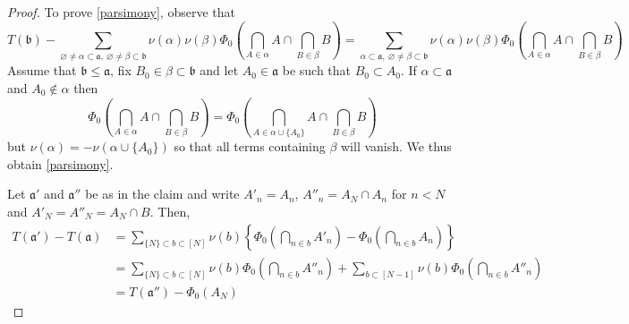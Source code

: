 \documentclass[11pt]{amsart}
\theoremstyle{plain}
\begin{document}
\begin{proof}
To prove \eqref{parsimony}, observe that
\begin{equation*}
T({\mathfrak b})
-\sum_{{\varnothing}\ne\alpha\subset{\mathfrak a},\ {\varnothing}\ne\beta\subset{\mathfrak b}}\nu(\alpha)\nu(\beta)
\Phi_0\left(\bigcap_{A\in\alpha}A\cap\bigcap_{B\in\beta}B\right)
=
\sum_{\alpha\subset{\mathfrak a},\ {\varnothing}\ne\beta\subset{\mathfrak b}}\nu(\alpha)\nu(\beta)
\Phi_0\left(\bigcap_{A\in\alpha}A\cap\bigcap_{B\in\beta}B\right)
\end{equation*}
Assume that ${\mathfrak b}\le{\mathfrak a}$, fix $B_0\in\beta\subset{\mathfrak b}$ and let $A_0\in{\mathfrak a}$ be 
such that $B_0\subset A_0$. If $\alpha\subset{\mathfrak a}$ 
and $A_0\notin\alpha$ then 
\begin{equation*}
\Phi_0\left(\bigcap_{A\in\alpha}A\cap\bigcap_{B\in\beta}B\right)
=\Phi_0\left(\bigcap_{A\in\alpha\cup\{A_0\}}A\cap\bigcap_{B\in\beta}B\right)
\end{equation*}
but $\nu(\alpha)=-\nu(\alpha\cup\{A_0\})$ so that all terms containing $\beta$ 
will vanish. We thus obtain \eqref{parsimony}. 

Let ${\mathfrak a}'$ and ${\mathfrak a}''$ be as in the claim and write $A'_n=A_n$, $A''_n=A_N\cap A_n$ 
for $n<N$ and $A'_N=A''_N=A_N\cap B$. Then,
\begin{align*}
T({\mathfrak a}')-T({\mathfrak a})
&=
\sum_{\{N\}\subset b\subset[N]}\nu(b)
\left\{\Phi_0\left(\bigcap_{n\in b}A'_n\right)-\Phi_0\left(\bigcap_{n\in b}A_n\right)\right\}\\
&=
\sum_{\{N\}\subset b\subset[N]}\nu(b)\Phi_0\left(\bigcap_{n\in b}A''_n\right)
+
\sum_{b\subset[N-1]}\nu(b)\Phi_0\left(\bigcap_{n\in b}A''_n\right)\\
&=
T({\mathfrak a}'')-\Phi_0(A_N)
\end{align*}
\end{proof}
\end{document}
